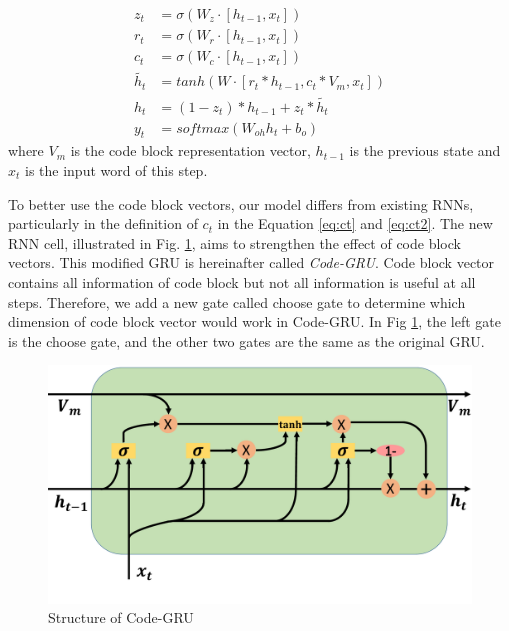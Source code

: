 \begin{align}
z_{t} &= \sigma(W_{z}\cdot[h_{t-1},x_{t}])\\
r_{t} &= \sigma(W_{r}\cdot[h_{t-1},x_{t}])\\
c_{t} &= \sigma(W_{c}\cdot[h_{t-1},x_{t}]) \label{eq:ct} \\
\tilde{h_{t}} &= tanh(W\cdot[r_{t}*h_{t-1},c_{t}*V_{m},x_{t}]) \label{eq:ct2}\\
h_{t} &= (1-z_{t})*h_{t-1} + z_{t}*\tilde{h_{t}} \\
y_{t} &= softmax(W_{oh}h_{t} + b_{o})
\end{align}
where $V_{m}$ is the code block representation vector, $h_{t-1}$ is the previous state and $x_{t}$ is the input word of this step.

To better use the code block vectors, our model differs from existing RNNs,
particularly in the definition of $c_{t}$ in the Equation \ref{eq:ct}
and \ref{eq:ct2}.
The new RNN cell, illustrated in Fig. \ref{fig:new_gru},
aims to strengthen the effect of code block vectors.
This modified GRU is hereinafter called \emph{Code-GRU}.
Code block vector contains all information of code block but not all information
is useful at all steps. Therefore, we add a new gate called choose gate
to determine which dimension of code block vector would work in Code-GRU.
In Fig \ref{fig:new_gru}, the left gate is the choose gate,
and the other two gates are the same as the original GRU.

\begin{figure}[th]
\centering
	\includegraphics[width=0.8\linewidth]{img/NewGRU.pdf}
\caption{Structure of Code-GRU}\label{fig:new_gru}
\end{figure}



